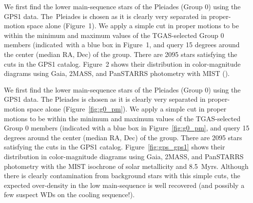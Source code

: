 \documentclass[modern,letterpaper]{aastex61}
\begin{document}


We first find the lower main-sequence stars of the Pleiades (Group 0) using the
GPS1 data. The Pleiades is chosen as it is clearly very separated in
proper-motion space alone (Figure 1). We apply a simple cut in proper motions
to be within the minimum and maximum values of the TGAS-selected Group 0
members (indicated with a blue box in Figure 1, and query 15 degrees around the
center (median RA, Dec) of the group. There are 2095 stars satisfying the cuts
in the GPS1 catalog. Figure 2 shows their distribution in color-magnitude
diagrams using Gaia, 2MASS, and PanSTARRS photometry with MIST (\citealt{2016ApJ...823..102C}).

We first find the lower main-sequence stars of the Pleiades (Group 0) using the
GPS1 data. The Pleiades is chosen as it is clearly very separated in
proper-motion space alone (Figure~\ref{fig:g0_pm}). We apply a simple cut in
proper motions to be within the minimum and maximum values of the TGAS-selected
Group 0 members (indicated with a blue box in Figure~\ref{fig:g0_pm}, and query 15
degrees around the center (median RA, Dec) of the group. There are 2095 stars
satisfying the cuts in the GPS1 catalog. Figure~\ref{fig:gps_gps1} shows their
distribution in color-magnitude diagrams using Gaia, 2MASS, and PanSTARRS
photometry with the MIST isochrone of solar metallicity and 8.5~Myrs. Although
there is clearly contamination from background stars with this simple cuts, the
expected over-density in the low main-sequence is well recovered (and possibly
a few suspect WDs on the cooling sequence!).
\end{document}
